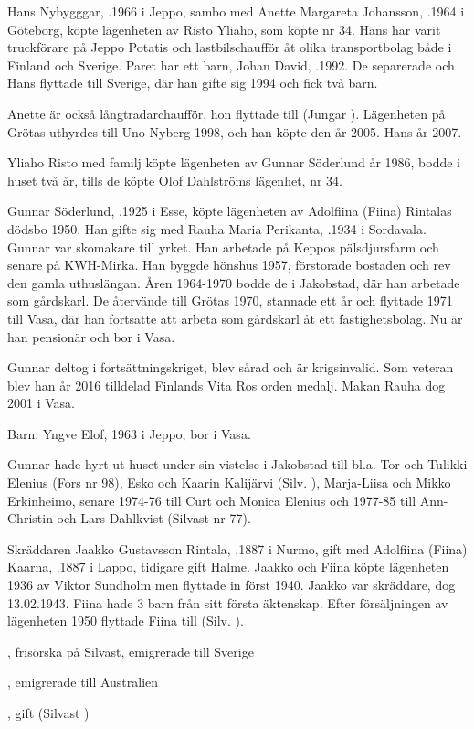 Hans Nybygggar, .1966 i Jeppo, sambo med Anette Margareta Johansson, .1964 i Göteborg,  köpte lägenheten av Risto Yliaho, som köpte nr 34.  Hans har varit truckförare på Jeppo Potatis och lastbilschaufför åt olika transportbolag både i Finland och Sverige. Paret har ett barn, Johan David, .1992. De separerade och Hans flyttade till Sverige, där han gifte sig 1994 och fick två barn.


Anette  är också långtradarchaufför, hon flyttade till (Jungar    ). Lägenheten på Grötas uthyrdes till Uno Nyberg 1998, och han köpte den år 2005.
Hans \textdied år 2007.


Yliaho Risto med familj köpte lägenheten av Gunnar Söderlund år 1986, bodde i huset två år, tills de köpte Olof Dahlströms lägenhet, nr 34.


Gunnar Söderlund, .1925 i Esse, köpte lägenheten av Adolfiina (Fiina) Rintalas dödsbo 1950. Han gifte sig med Rauha Maria Perikanta, .1934 i Sordavala.  Gunnar var skomakare till yrket. Han arbetade på Keppos pälsdjursfarm och senare på KWH-Mirka. Han byggde hönshus 1957, förstorade bostaden och rev den gamla uthuslängan. Åren 1964-1970 bodde de i Jakobstad, där han arbetade som gårdskarl. De återvände till Grötas 1970, stannade ett år och flyttade 1971 till Vasa, där han fortsatte  att arbeta som  gårdskarl åt ett fastighetsbolag. Nu är han pensionär och bor i Vasa.

Gunnar deltog i fortsättningskriget, blev sårad och är krigsinvalid. Som veteran blev han år 2016 tilldelad Finlands Vita Ros orden medalj. Makan Rauha dog 2001 i Vasa.

Barn: Yngve Elof,  1963 i Jeppo, bor i Vasa.

Gunnar hade hyrt ut huset under sin vistelse i Jakobstad till bl.a. Tor och Tulikki Elenius (Fors nr 98), Esko och Kaarin Kalijärvi (Silv.     ), Marja-Liisa och Mikko Erkinheimo, senare 1974-76 till Curt och Monica Elenius och 1977-85 till Ann-Christin och Lars Dahlkvist (Silvast nr 77).


Skräddaren Jaakko Gustavsson Rintala, .1887 i Nurmo, gift med Adolfiina (Fiina) Kaarna, .1887 i Lappo, tidigare gift Halme. Jaakko och Fiina  köpte lägenheten 1936 av Viktor Sundholm men flyttade in först 1940. Jaakko var skräddare, dog 13.02.1943.  Fiina hade 3 barn från sitt första äktenskap. Efter försäljningen  av lägenheten 1950 flyttade Fiina till (Silv.     ).
\begin{jhchildren}
  \item {}, frisörska  på Silvast, emigrerade till Sverige
  \item {}, emigrerade till Australien
  \item {}, gift (Silvast      )
\end{jhchildren}


